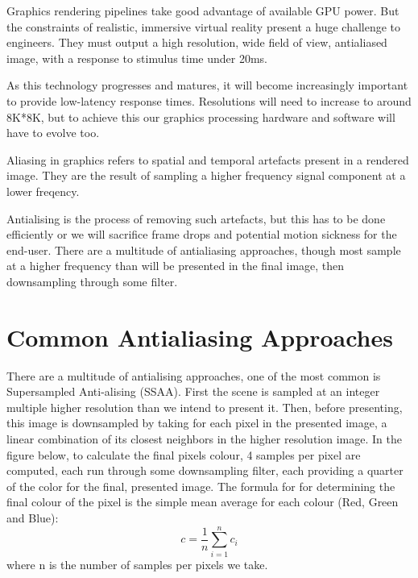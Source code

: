 \documentclass[12pt,a4paper,twoside,openright]{report}
\begin{document}
Graphics rendering pipelines take good advantage of available GPU power. But the constraints of realistic, immersive virtual reality present a huge challenge to engineers. They must output a high resolution, wide field of view, antialiased image, with a response to stimulus time under 20ms.

As this technology progresses and matures, it will become increasingly important to provide low-latency response times. Resolutions will need to increase to around 8K*8K, but to achieve this our graphics processing hardware and software will have to evolve too.

Aliasing in graphics refers to spatial and temporal artefacts present in a rendered image. They are the result of sampling a higher frequency signal component at a lower freqency.

Antialising is the process of removing such artefacts, but this has to be done efficiently or we will sacrifice frame drops and potential motion sickness for the end-user.
There are a multitude of antialiasing approaches, though most sample at a higher frequency than will be presented in the final image, then downsampling through some filter. 

\section{Common Antialiasing Approaches}\label{supersampling}

There are a multitude of antialising approaches, one of the most common is Supersampled Anti-alising (SSAA).
First the scene is sampled at an integer multiple higher resolution than we intend to present it.
Then, before presenting, this image is downsampled by taking for each pixel in the presented image, a linear combination of its closest neighbors in the higher resolution image. In the figure below, to calculate the final pixels colour, 4 samples per pixel are computed, each run through some downsampling filter, each providing a quarter of the color for the final, presented image. The formula for for determining the final colour of the pixel is the simple mean average for each colour (Red, Green and Blue):
$$ c = \frac{1}{n}\displaystyle\sum_{i=1}^n c_i $$ where n is the number of samples per pixels we take.
\end{document}

